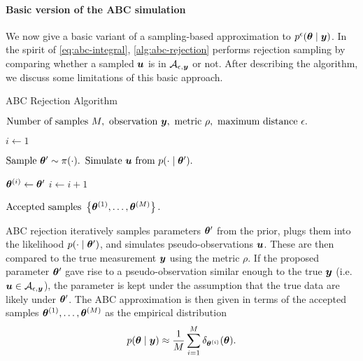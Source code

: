 \paragraph{Basic version of the ABC simulation}
We now give a basic variant of a sampling-based approximation to $p^\epsilon(\bm{\theta} \mid \bm{y})$. In the spirit of \eqref{eq:abc-integral}, \autoref{alg:abc-rejection} performs rejection sampling by comparing whether a sampled $\bm{u}$ is in $\mathcal{A}_{\epsilon, \bm{y}}$ or not. After describing the algorithm, we discuss some limitations of this basic approach.
\begin{algorithm}[ht]
    \caption{ABC Rejection Algorithm}
    \label{alg:abc-rejection}
    \begin{algorithmic}[1]
        \Input $\text{Number of samples } M, \text{ observation } \bm{y}, \text{ metric } \rho, \text{ maximum distance } \epsilon.$
        
        \State $i \gets 1$
        
        \State $\text{Sample } \bm{\theta}^\prime \sim \pi(\cdot).$ 
        \State $\text{Simulate } \bm{u} \text{ from } p(\cdot \mid \bm{\theta}^\prime).$ 
        
        \If {$\rho(\bu, \by) \leq \epsilon$}
        \State $\bm{\theta}^{(i)} \gets \bm{\theta}^\prime$ 
        \State $i \gets i + 1$
        \EndIf
        \EndWhile
        
        \Output $\text{Accepted samples } \left\{ \bm{\theta}^{(1)}, \ldots, \bm{\theta}^{(M)} \right\}.$
    \end{algorithmic}
\end{algorithm}

ABC rejection iteratively samples parameters $\bm{\theta}^\prime$ from the prior, plugs them into the likelihood $p(\cdot \mid \bm{\theta}^\prime)$, and simulates pseudo-observations $\bm{u}$. These are then compared to the true measurement $\bm{y}$ using the metric $\rho$. If the proposed parameter $\bm{\theta}^\prime$ gave rise to a pseudo-observation similar enough to the true $\bm{y}$ (i.e. $\bm{u} \in \mathcal{A}_{\epsilon, \bm{y}}$), the parameter is kept under the assumption that the true data are likely under $\bm{\theta}^\prime$. The ABC approximation is then given in terms of the accepted samples $\bm{\theta}^{(1)}, \ldots, \bm{\theta}^{(M)}$ as the empirical distribution
\begin{equation*}
p(\bm{\theta} \mid \bm{y}) \approx \frac{1}{M} \sum_{i=1}^M \delta_{\bm{\theta}^{(i)}}(\bm{\theta}).
\end{equation*}

